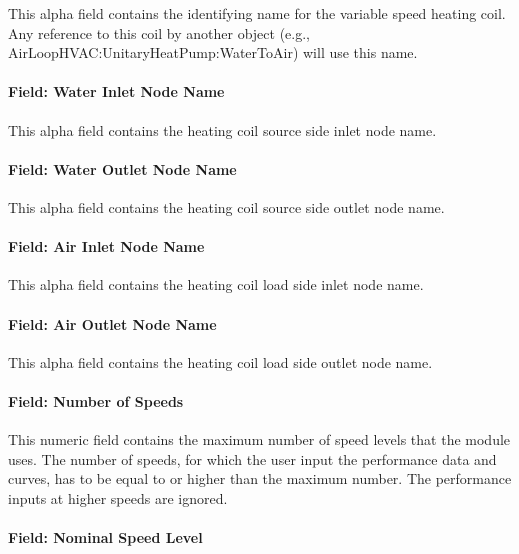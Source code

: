 This alpha field contains the identifying name for the variable speed heating coil. Any reference to this coil by another object (e.g., AirLoopHVAC:UnitaryHeatPump:WaterToAir) will use this name.

\paragraph{Field: Water Inlet Node Name}\label{field-water-inlet-node-name-10}

This alpha field contains the heating coil source side inlet node name.

\paragraph{Field: Water Outlet Node Name}\label{field-water-outlet-node-name-10}

This alpha field contains the heating coil source side outlet node name.

\paragraph{Field: Air Inlet Node Name}\label{field-air-inlet-node-name-21}

This alpha field contains the heating coil load side inlet node name.

\paragraph{Field: Air Outlet Node Name}\label{field-air-outlet-node-name-21}

This alpha field contains the heating coil load side outlet node name.

\paragraph{Field: Number of Speeds}\label{field-number-of-speeds-5}

This numeric field contains the maximum number of speed levels that the module uses. The number of speeds, for which the user input the performance data and curves, has to be equal to or higher than the maximum number. The performance inputs at higher speeds are ignored.

\paragraph{Field: Nominal Speed Level}\label{field-nominal-speed-level-3}

